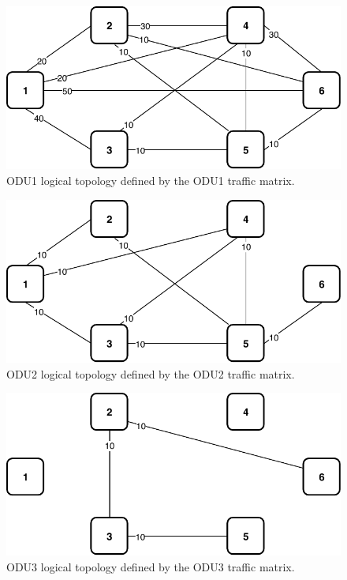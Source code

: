 \begin{figure}[h!]
\centering
\includegraphics[width=12cm]{sdf/ilp/transparent_survivability/figures/logical_topology_ODU1_medium}
\caption{ODU1 logical topology defined by the ODU1 traffic matrix.}
\label{logical2_ODU1_medium}
\end{figure}

\begin{figure}[h!]
\centering
\includegraphics[width=12cm]{sdf/ilp/transparent_survivability/figures/logical_topology_ODU2_medium}
\caption{ODU2 logical topology defined by the ODU2 traffic matrix.}
\label{logical2_ODU2_medium}
\end{figure}

\begin{figure}[h!]
\centering
\includegraphics[width=12cm]{sdf/ilp/transparent_survivability/figures/logical_topology_ODU3_medium}
\caption{ODU3 logical topology defined by the ODU3 traffic matrix.}
\label{logical2_ODU3_medium}
\end{figure}

